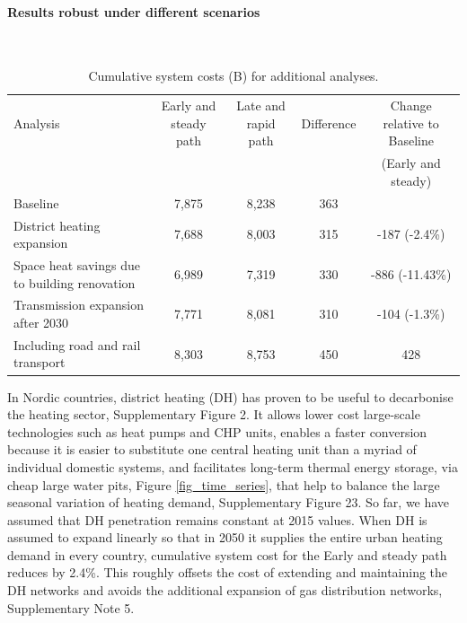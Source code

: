 \documentclass[5p]{elsarticle} %
\begin{document}
 
\paragraph{\textbf{Results robust under different scenarios}} \

\begin{table}[!h]
\footnotesize
\centering
\begin{threeparttable}
\caption{Cumulative system costs (B\EUR) for additional analyses.} \label{tab_additional_analyses}
\centering
\begin{tabularx}{18.5cm}{lcccc}
\toprule
Analysis & Early and steady path & Late and rapid path & Difference & Change relative to Baseline \\
 &  &  & & (Early and steady) \\
\midrule
Baseline	& 7,875	& 8,238	& 363 & \\
District heating expansion	& 7,688	& 8,003	& 315 & -187 (-2.4\%) \\
Space heat savings due to building renovation	& 6,989	& 7,319	& 330 & -886 (-11.43\%)\\
Transmission expansion after 2030 & 7,771 &	8,081	& 310 & -104 (-1.3\%)\\
Including road and rail transport &	8,303	& 8,753 &	450 & 428 \\
\bottomrule
\end{tabularx}
\end{threeparttable}
\end{table}

In Nordic countries, district heating (DH) has proven to be useful to decarbonise the heating sector, Supplementary Figure 2. It allows lower cost large-scale technologies such as heat pumps and CHP units, enables a faster conversion because it is easier to substitute one central heating unit than a myriad of individual domestic systems, and facilitates long-term thermal energy storage, via cheap large water pits, Figure \ref{fig_time_series}, that help to balance the large seasonal variation of heating demand, Supplementary Figure 23. So far, we have assumed that DH penetration remains constant at 2015 values. When DH is assumed to expand linearly so that in 2050 it supplies the entire urban heating demand in every country, cumulative system cost for the Early and steady path reduces by 2.4\%. This roughly offsets the cost of extending and maintaining the DH networks and avoids the additional expansion of gas distribution networks, Supplementary Note 5. \\
\end{document}
